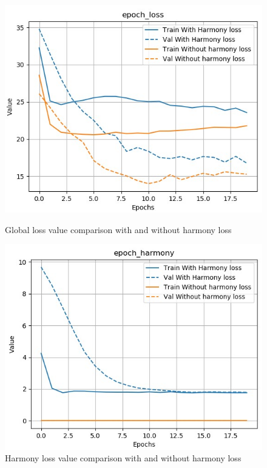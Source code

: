 \documentclass[12pt]{report}
\begin{document}
\begin{figure}[htbp]
    \begin{minipage}{0.5\textwidth}
        \begin{center}
            \includegraphics[width=\textwidth]{images/experiences/harmony-rnn/loss-comparison-harmony.jpg}
            \caption{Global loss value comparison with and without harmony loss}
            \label{fig:loss-comparison-harmony}
        \end{center}
    \end{minipage} \hfill
    \begin{minipage}{0.5 \textwidth}
        \begin{center}
            \includegraphics[width=\textwidth]{images/experiences/harmony-rnn/harmony-comparison-harmony.jpg}
            \caption{Harmony loss value comparison with and without harmony loss}
            \label{fig:harmony-comparison-harmony}
        \end{center}
    \end{minipage}
\end{figure}
\end{document}

